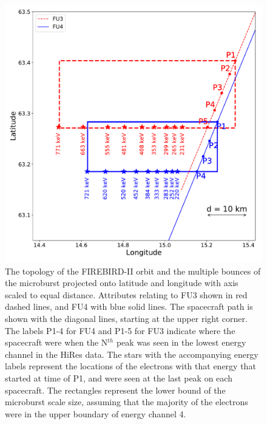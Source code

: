 \documentclass[draft, linenumbers]{agujournal}
\begin{document}
\begin{figure}
\includegraphics[width=\textwidth]{decay_microburst_distance_corrected_CH4_last_pk_drift_color_2.pdf}
\caption{The topology of the FIREBIRD-II orbit and the multiple bounces of the microburst projected onto latitude and longitude with axis scaled to equal distance. Attributes relating to FU3 shown in red dashed lines, and FU4 with blue solid lines. The spacecraft path is shown with the diagonal lines, starting at the upper right corner. The labels P1-4 for FU4 and P1-5 for FU3 indicate where the spacecraft were when the N$^{th}$ peak was seen in the lowest energy channel in the HiRes data. The stars with the accompanying energy labels represent the locations of the electrons with that energy that started at time of P1, and were seen at the last peak on each spacecraft. The rectangles represent the lower bound of the microburst scale size, assuming that the majority of the electrons were in the upper boundary of energy channel 4.}
\label{map_plot}
\end{figure}
\end{document}

